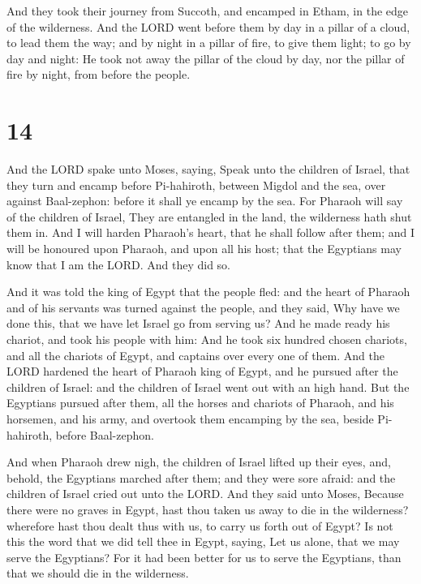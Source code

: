  And they took their journey from Succoth, and encamped
in Etham, in the edge of the wilderness.  And the LORD
went before them by day in a pillar of a cloud, to lead them the way;
and by night in a pillar of fire, to give them light; to go by day and
night:  He took not away the pillar of the cloud by day,
nor the pillar of fire by night, from before the people.

\hypertarget{section-13}{%
\section{14}\label{section-13}}

 And the LORD spake unto Moses, saying, 
Speak unto the children of Israel, that they turn and encamp before
Pi-hahiroth, between Migdol and the sea, over against Baal-zephon:
before it shall ye encamp by the sea.  For Pharaoh will
say of the children of Israel, They are entangled in the land, the
wilderness hath shut them in.  And I will harden Pharaoh's
heart, that he shall follow after them; and I will be honoured upon
Pharaoh, and upon all his host; that the Egyptians may know that I am
the LORD. And they did so.

 And it was told the king of Egypt that the people fled:
and the heart of Pharaoh and of his servants was turned against the
people, and they said, Why have we done this, that we have let Israel go
from serving us?  And he made ready his chariot, and took
his people with him:  And he took six hundred chosen
chariots, and all the chariots of Egypt, and captains over every one of
them.  And the LORD hardened the heart of Pharaoh king of
Egypt, and he pursued after the children of Israel: and the children of
Israel went out with an high hand.  But the Egyptians
pursued after them, all the horses and chariots of Pharaoh, and his
horsemen, and his army, and overtook them encamping by the sea, beside
Pi-hahiroth, before Baal-zephon.

 And when Pharaoh drew nigh, the children of Israel
lifted up their eyes, and, behold, the Egyptians marched after them; and
they were sore afraid: and the children of Israel cried out unto the
LORD.  And they said unto Moses, Because there were no
graves in Egypt, hast thou taken us away to die in the wilderness?
wherefore hast thou dealt thus with us, to carry us forth out of Egypt?
 Is not this the word that we did tell thee in Egypt,
saying, Let us alone, that we may serve the Egyptians? For it had been
better for us to serve the Egyptians, than that we should die in the
wilderness.

